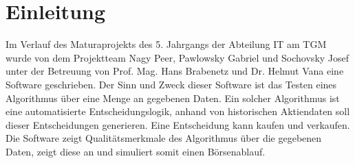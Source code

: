 \chapter{Einleitung}
Im Verlauf des Maturaprojekts des 5. Jahrgangs der Abteilung IT am TGM wurde von dem Projektteam Nagy Peer, Pawlowsky Gabriel und Sochovsky Josef unter der Betreuung von Prof. Mag. Hans Brabenetz und Dr. Helmut Vana eine Software geschrieben. Der Sinn und Zweck dieser Software ist das Testen eines Algorithmus über eine Menge an gegebenen Daten. Ein solcher Algorithmus ist eine automatisierte Entscheidungslogik, anhand von historischen Aktiendaten soll dieser Entscheidungen generieren. Eine Entscheidung kann kaufen und verkaufen. \\
Die Software zeigt Qualitätsmerkmale des Algorithmus über die gegebenen Daten, zeigt diese an und simuliert somit einen Börsenablauf.
